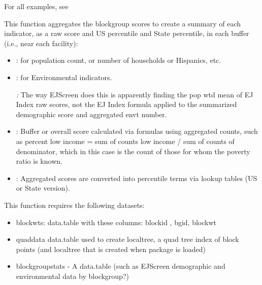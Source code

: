 \documentclass[a4paper]{book}
\begin{document}
%
\begin{Details}\relax
For all examples, see 

This function aggregates the blockgroup scores to create a summary of each indicator,
as a raw score and US percentile and State percentile,
in each buffer (i.e., near each facility):
\begin{itemize}

\item{} : for population count, or number of households or Hispanics, etc.
\item{} : for  Environmental indicators.

\emph{:} The way EJScreen
does this is apparently finding the pop wtd mean of EJ Index raw scores,
not the EJ Index formula applied to the summarized demographic score and aggregated envt number.
\item{} : Buffer or overall score calculated via formulas using aggregated counts,
such as percent low income = sum of counts low income / sum of counts of denominator,
which in this case is the count of those for whom the poverty ratio is known.
\item{} : Aggregated scores are converted into percentile terms via lookup tables (US or State version).

\end{itemize}


This function requires the following datasets:
\begin{itemize}

\item{} blockwts: data.table with these columns: blockid , bgid, blockwt
\item{} quaddata data.table used to create localtree, a quad tree index of block points
(and localtree that is created when package is loaded)
\item{} blockgroupstats - A data.table (such as EJScreen demographic and environmental data by blockgroup?)

\end{itemize}

\end{Details}
%
\end{document}
